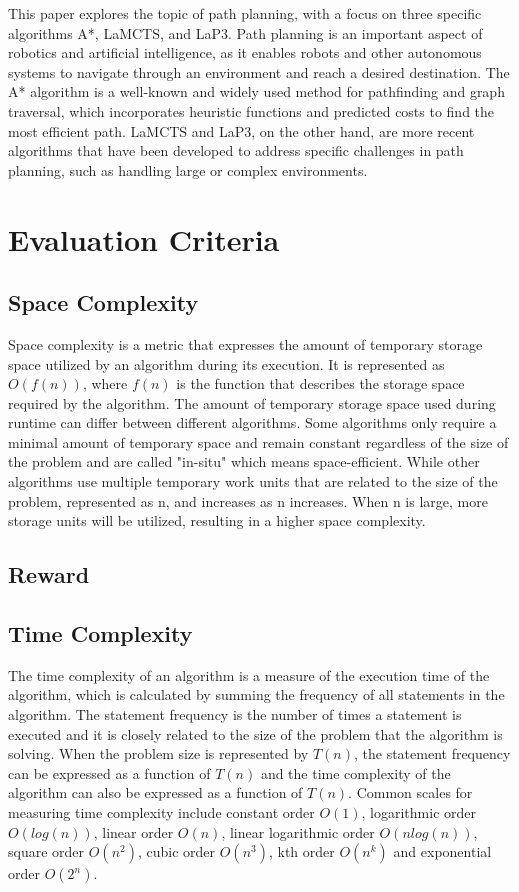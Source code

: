 \documentclass[bibliography=totoc]{scrartcl}
\begin{document}
This paper explores the topic of path planning, with a focus on three specific algorithms A*, LaMCTS, and LaP3.
Path planning is an important aspect of robotics and artificial intelligence, as it enables robots and other autonomous systems to navigate through an environment and reach a desired destination.
The A* algorithm is a well-known and widely used method for pathfinding and graph traversal, which incorporates heuristic functions and predicted costs to find the most efficient path.
LaMCTS and LaP3, on the other hand, are more recent algorithms that have been developed to address specific challenges in path planning, such as handling large or complex environments.

\section{Evaluation Criteria} \label{corner_detection}
\subsection{Space Complexity}
Space complexity is a metric that expresses the amount of temporary storage space utilized by an algorithm during its execution.
It is represented as $O(f(n))$, where $f(n)$ is the function that describes the storage space required by the algorithm. \cite[p. 303]{TheoryComputation}
The amount of temporary storage space used during runtime can differ between different algorithms.
Some algorithms only require a minimal amount of temporary space and remain constant regardless of the size of the problem and are called "in-situ" which means space-efficient.
While other algorithms use multiple temporary work units that are related to the size of the problem, represented as n, and increases as n increases.
When n is large, more storage units will be utilized, resulting in a higher space complexity.

\subsection{Reward}


\subsection{Time Complexity}
The time complexity of an algorithm is a measure of the execution time of the algorithm, which is calculated by summing the frequency of all statements in the algorithm.
The statement frequency is the number of times a statement is executed and it is closely related to the size of the problem that the algorithm is solving.
When the problem size is represented by $T(n)$, the statement frequency can be expressed as a function of $T(n)$ and the time complexity of the algorithm can also be expressed as a function of $T(n)$. \cite[p. 248 l. 22 ]{TheoryComputation}
Common scales for measuring time complexity include constant order $O(1)$, logarithmic order $O(log(n))$, linear order $O(n)$, linear logarithmic order $O(nlog(n))$, square order $O(n^2)$, cubic order $O(n^3)$, kth order $O(n^k)$ and exponential order $O(2^n)$.
\end{document}
